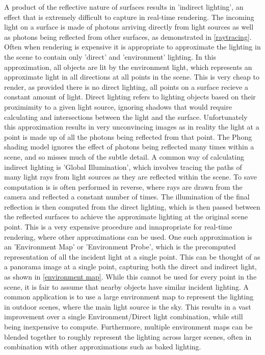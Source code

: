 \documentclass[ %
                    author={Gavin Parker},
                supervisor={Dr. Neill Campbell},
                    degree={MEng},
                     title={Deep Siamese Networks for Illumination Estimation from Stereo Images},
                  subtitle={},
                      type={research},
                      year={2018} ]{dissertation}
\begin{document}
A product of the reflective nature of surfaces results in 'indirect lighting', an effect that is extremely difficult to capture in real-time rendering. The incoming light on a surface is made of photons arriving directly from light sources as well as photons being reflected from other surfaces, as demonstrated in \ref{raytracing}. Often when rendering is expensive it is appropriate to approximate the lighting in the scene to contain only 'direct' and 'environment' lighting. In this approximation, all objects are lit by the environment light, which represents an approximate light in all directions at all points in the scene. This is very cheap to render, as provided there is no direct lighting, all points on a surface recieve a constant amount of light. Direct lighting refers to lighting objects based on their proximimity to a given light source, ignoring shadows that would require calculating and intersections between the light and the surface. Unfortunately this approximation results in very unconvincing images as in reality the light at a point is made up of all the photons being reflected from that point. The Phong shading model ignores the effect of photons being reflected many times within a scene, and so misses much of the subtle detail. A common way of calculating indirect lighting is 'Global Illumination', which involves tracing the paths of many light rays from light sources as they are reflected within the scene. To save computation is is often performed in reverse, where rays are drawn from the camera and reflected a constant number of times. The illumination of the final reflection is then computed from the direct lighting, which is then passed between the reflected surfaces to achieve the approximate lighting at the original scene point. This is a very expensive procedure and innapropriate for real-time rendering, where other approximations can be used. One such approximation is an 'Environment Map' or 'Environment Probe', which is the precomputed representation of all the incident light at a single point. This can be thought of as a panorama image at a single point, capturing both the direct and indirect light, as shown in \ref{environment map}. While this cannot be used for every point in the scene, it is fair to assume that nearby objects have similar incident lighting. A common application is to use a large environment map to represent the lighting in outdoor scenes, where the main light source is the sky. This results in a vast improvement over a single Environment/Direct light combination, while still being inexpensive to compute. Furthermore, multiple environment maps can be blended together to roughly represent the lighting across larger scenes, often in combination with other approximations such as baked lighting.
\end{document}
